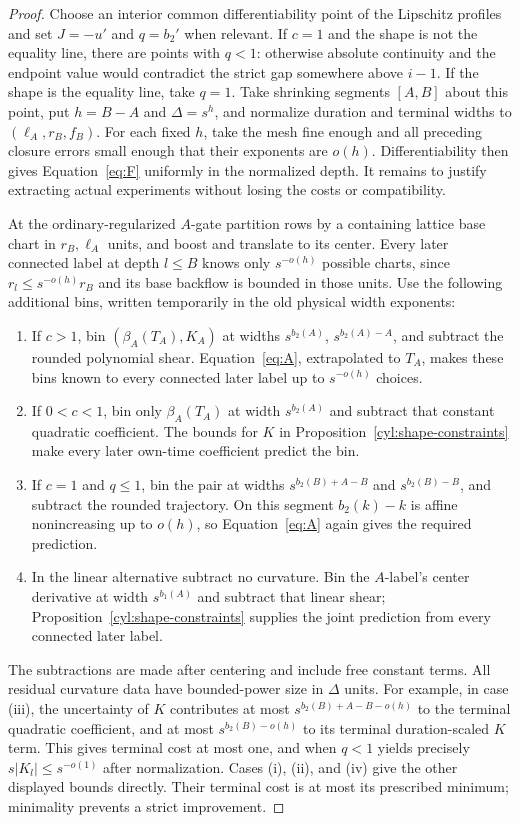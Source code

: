 \begin{proof}
Choose an interior common differentiability point of the Lipschitz
profiles and set $J=-u'$ and $q=b_2'$ when relevant.  If $c=1$ and the
shape is not the equality line, there are points with $q<1$: otherwise
absolute continuity and the endpoint value would contradict the strict
gap somewhere above $i-1$.  If the shape is the equality line, take
$q=1$.  Take shrinking segments $[A,B]$ about this point, put
$h=B-A$ and $\Delta=s^h$, and normalize duration and terminal widths
to $(\ell_A,r_B,f_B)$.  For each fixed $h$, take the mesh fine enough
and all preceding closure errors small enough that their exponents are
$o(h)$.  Differentiability then gives Equation~\eqref{eq:F} uniformly
in the normalized depth.  It remains to justify extracting actual
experiments without losing the costs or compatibility.

At the ordinary-regularized $A$-gate partition rows by a containing
lattice base chart in $r_B,\ell_A$ units, and boost and translate to
its center.  Every later connected label at depth $l\le B$ knows only
$s^{-o(h)}$ possible charts, since $r_l\le s^{-o(h)}r_B$ and its base
backflow is bounded in those units.  Use the following additional bins,
written temporarily in the old physical width exponents:
\begin{enumerate}[label=\textup{(\roman*)}]
\item If $c>1$, bin $(\beta_A(T_A),K_A)$ at widths
$s^{b_2(A)}$, $s^{b_2(A)-A}$, and subtract the rounded polynomial shear.
Equation~\eqref{eq:A}, extrapolated to $T_A$, makes these bins known
to every connected later label up to $s^{-o(h)}$ choices.
\item If $0<c<1$, bin only $\beta_A(T_A)$ at width $s^{b_2(A)}$ and
subtract that constant quadratic coefficient.  The bounds for $K$ in
Proposition~\ref{cyl:shape-constraints} make every later own-time
coefficient predict the bin.
\item If $c=1$ and $q\le1$, bin the pair at widths
$s^{b_2(B)+A-B}$ and $s^{b_2(B)-B}$, and subtract the rounded trajectory.
On this segment $b_2(k)-k$ is affine nonincreasing up to $o(h)$, so
Equation~\eqref{eq:A} again gives the required prediction.
\item In the linear alternative subtract no curvature.  Bin the
$A$-label's center derivative at width $s^{b_1(A)}$ and subtract that
linear shear; Proposition~\ref{cyl:shape-constraints} supplies the
joint prediction from every connected later label.
\end{enumerate}
The subtractions are made after centering and include free constant
terms.  All residual curvature data have bounded-power size in $\Delta$
units.  For example, in case (iii), the uncertainty of $K$ contributes
at most $s^{b_2(B)+A-B-o(h)}$ to the terminal quadratic coefficient,
and at most $s^{b_2(B)-o(h)}$ to its terminal duration-scaled $K$ term.
This gives terminal cost at most one, and when $q<1$ yields precisely
$s|K_l|\le s^{-o(1)}$ after normalization.  Cases (i), (ii), and (iv)
give the other displayed bounds directly.  Their terminal cost is at
most its prescribed minimum; minimality prevents a strict improvement.


\end{proof}
